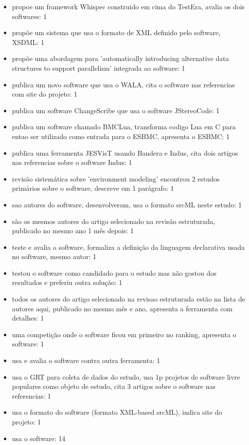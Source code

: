\begin{itemize}
\item propoe um framework Whispec construido em cima do TestEra, avalia os dois softwares: 1
\item propõe um sistema que usa o formato de XML definido pelo software, XSDML: 1
\item propõe uma abordagem para 'automatically introducing alternative data structures to support parallelism' integrada ao software: 1
\item publica um novo software que usa o WALA, cita o software nas referencias com site do projeto: 1
\item publica um software ChangeScribe que usa o software JStereoCode: 1
\item publica um software chamado BMCLua, transforma codigo Lua em C para entao ser utilizado como entrada para o ESBMC, apresenta o ESBMC: 1
\item publica uma ferramenta JESVisT usando Bandera e Indus, cita dois artigos nas referencias sobre o software Indus: 1
\item revisão sistemática sobre 'environment modeling' encontrou 2 estudos primários sobre o software, descreve em 1 parágrafo: 1
\item sao autores do software, desenvolveram, usa o formato srcML neste estudo: 1
\item são os mesmos autores do artigo selecionado na revisão estruturada, publicado no mesmo ano 1 mês depois: 1
\item teste e avalia o software, formaliza a definição da linguagem declarativa usada no software, mesmo autor: 1
\item testou o software como candidado para o estudo mas não gostou dos resultados e preferiu outra solução: 1
\item todos os autores do artigo selecionado na revisao estruturada estão na lista de autores aqui, publicado no mesmo mês e ano, apresenta a ferramenta com detalhes: 1
\item uma competição onde o software ficou em primeiro no ranking, apresenta o software: 1
\item usa e avalia o software contra outra ferramenta: 1
\item usa o GRT para coleta de dados do estudo, usa 1p projetos de software livre populares como objeto de estudo, cita 3 artigos sobre o software nas referencias: 1
\item usa o formato do software (formato XML-based srcML), indica site do projeto: 1
\item usa o software: 14

\end{itemize}
